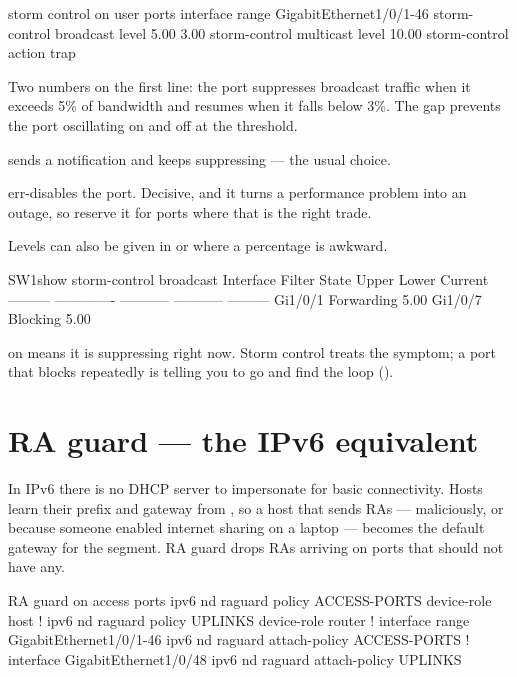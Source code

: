 \begin{config}{storm control on user ports}
interface range GigabitEthernet1/0/1-46
 storm-control broadcast level 5.00 3.00
 storm-control multicast level 10.00
 storm-control action trap
\end{config}

Two numbers on the first line: the port suppresses broadcast traffic when it
exceeds 5\% of bandwidth and resumes when it falls below 3\%. The gap prevents
the port oscillating on and off at the threshold.

\begin{tight}
  \item {} sends a notification and keeps suppressing --- the
        usual choice.
  \item {} err-disables the port. Decisive, and it turns a
        performance problem into an outage, so reserve it for ports where that is
        the right trade.
  \item Levels can also be given in  or  where a percentage is
        awkward.
\end{tight}

\begin{verify}{SW1}{show storm-control broadcast}
Interface  Filter State   Upper        Lower        Current
---------  -------------  -----------  -----------  ---------
Gi1/0/1    Forwarding     5.00%
Gi1/0/7    Blocking       5.00%
\end{verify}

 on  means it is suppressing right now. Storm control
treats the symptom; a port that blocks repeatedly is telling you to go and find
the loop ().

\section{RA guard --- the IPv6 equivalent}

In IPv6 there is no DHCP server to impersonate for basic connectivity. Hosts
learn their prefix and gateway from , so a host that
sends RAs --- maliciously, or because someone enabled internet sharing on a
laptop --- becomes the default gateway for the segment. RA guard drops RAs
arriving on ports that should not have any.

\begin{config}{RA guard on access ports}
ipv6 nd raguard policy ACCESS-PORTS
 device-role host
!
ipv6 nd raguard policy UPLINKS
 device-role router
!
interface range GigabitEthernet1/0/1-46
 ipv6 nd raguard attach-policy ACCESS-PORTS
!
interface GigabitEthernet1/0/48
 ipv6 nd raguard attach-policy UPLINKS
\end{config}

